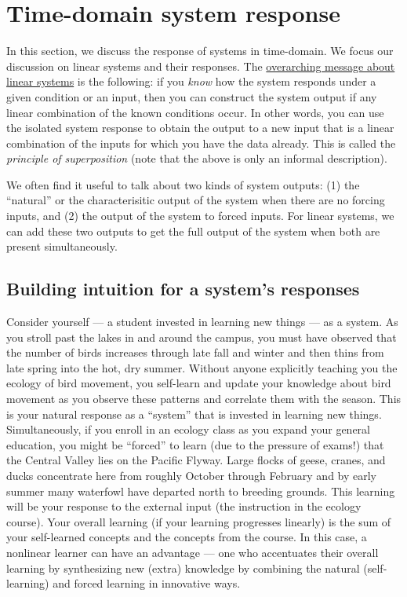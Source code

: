 \documentclass{ee102_notes}
\begin{document}
\section{Time-domain system response}
In this section, we discuss the response of systems in time-domain. We focus our discussion on linear systems and their responses. The \ul{overarching message about linear systems} is the following: if you \emph{know} how the system responds under a given condition or an input, then you can construct the system output if any linear combination of the known conditions occur. In other words, you can use the isolated system response to obtain the output to a new input that is a linear combination of the inputs for which you have the data already. This is called the \emph{principle of superposition} (note that the above is only an informal description). 

We often find it useful to talk about two kinds of system outputs: (1) the ``natural'' or the characterisitic output of the system when there are no forcing inputs, and (2) the output of the system to forced inputs. For linear systems, we can add these two outputs to get the full output of the system when both are present simultaneously.

\subsection{Building intuition for a system's responses}
Consider yourself --- a student invested in learning new things --- as a system. As you stroll past the lakes in and around the campus, you must have observed that the number of birds increases through late fall and winter and then thins from late spring into the hot, dry summer. Without anyone explicitly teaching you the ecology of bird movement, you self-learn and update your knowledge about bird movement as you observe these patterns and correlate them with the season. This is your natural response as a ``system'' that is invested in learning new things. Simultaneously, if you enroll in an ecology class as you expand your general education, you might be ``forced'' to learn (due to the pressure of exams!) that the Central Valley lies on the Pacific Flyway. Large flocks of geese, cranes, and ducks concentrate here from roughly October through February and by early summer many waterfowl have departed north to breeding grounds. This learning will be your response to the external input (the instruction in the ecology course). Your overall learning (if your learning progresses linearly) is the sum of your self-learned concepts and the concepts from the course. In this case, a nonlinear learner can have an advantage --- one who accentuates their overall learning by synthesizing new (extra) knowledge by combining the natural (self-learning) and forced learning in innovative ways.
\end{document}
